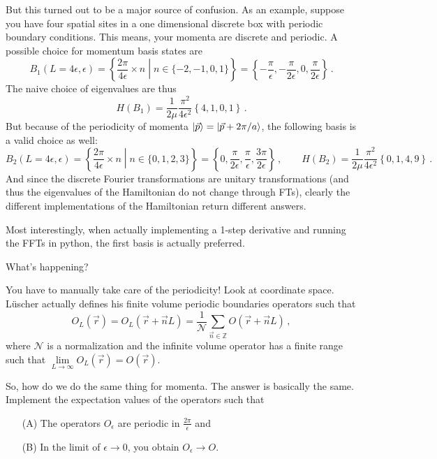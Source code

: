 \documentclass[
    aps,
    prl,
    showkeys,
    nofootinbib,
    floatfix
]{revtex4-1}
\begin{document}
But this turned out to be a major source of confusion.
As an example, suppose you have four spatial sites in a one dimensional discrete box with periodic boundary conditions.
This means, your momenta are discrete and periodic.
A possible choice for momentum basis states are
\begin{equation}
	B_1(L = 4\epsilon, \epsilon)
	= \left\{ \frac{2\pi}{4\epsilon} \times n \middle \vert n \in \{-2, -1, 0, 1\} \right\}
	= \left\{ -\frac{\pi}{\epsilon}, -\frac{\pi}{2\epsilon}, 0, \frac{\pi}{2\epsilon} \right\} \, .
\end{equation}
The naive choice of eigenvalues are thus
\begin{equation}
    H(B_1) = \frac{1}{2\mu} \frac{\pi^2}{4 \epsilon^2} \left\{ 4, 1, 0, 1\right\} \, .
\end{equation}
But because of the periodicity of momenta $\ket{\vec p} = \ket{\vec p + 2\pi/a}$, the following basis is a valid choice as well:
\begin{equation}
	B_2(L = 4\epsilon, \epsilon)
	= \left\{ \frac{2\pi}{4\epsilon} \times n \middle \vert n \in \{0, 1, 2, 3\} \right\}
	= \left\{ 0, \frac{\pi}{2\epsilon}, \frac{\pi}{\epsilon}, \frac{3\pi}{2\epsilon} \right\} \, , \qquad
	H(B_2) = \frac{1}{2\mu} \frac{\pi^2}{4 \epsilon^2} \left\{ 0, 1, 4, 9\right\} \, .
\end{equation}
And since the discrete Fourier transformations are unitary transformations (and thus the eigenvalues of the Hamiltonian do not change through FTs), clearly the different implementations of the Hamiltonian return different answers.

Most interestingly, when actually implementing a 1-step derivative and running the FFTs in python, the first basis is actually preferred.

What's happening?

You have to manually take care of the periodicity!
Look at coordinate space.
Lüscher actually defines his finite volume periodic boundaries operators such that
\begin{equation}
    O_L(\vec r) = O_L(\vec r + \vec n L) = \frac{1}{\mathcal N} \sum _{\vec n \in \mathbb Z} O(\vec r + \vec n L)\, ,
\end{equation}
where $\mathcal N$ is a normalization and the infinite volume operator has a finite range such that $\lim\limits_{L\to \infty} O_L(\vec r) = O(\vec r)$.

So, how do we do the same thing for momenta.
The answer is basically the same.
Implement the expectation values of the operators such that
\begin{itemize}
    \item[(A)] The operators $O_\epsilon$ are periodic in $\frac{2\pi}{\epsilon}$ and
    \item[(B)] In the limit of $\epsilon \to 0$, you obtain  $O_\epsilon \to  O$.
\end{itemize}
\end{document}
